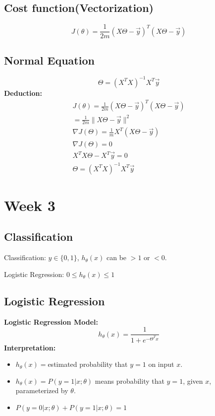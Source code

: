 \documentclass{article}
\begin{document}
\subsection{Cost function(Vectorization)}
$$J(\theta)=\frac{1}{2m}(X\Theta-\vec{y})^T(X\Theta-\vec{y})$$

\subsection{Normal Equation}
$$\Theta = (X^TX)^{-1}X^T\vec{y}$$
\textbf{Deduction:}
	\begin{eqnarray}
		J(\theta)=\frac{1}{2m}(X\Theta-\vec{y})^T(X\Theta-\vec{y})\nonumber\\
			=\frac{1}{2m}\lVert X\Theta - \vec{y}\rVert^2 \nonumber\\
		\nabla J(\Theta)=\frac{1}{m}X^T(X\Theta-\vec{y})\nonumber\\
		\nabla J(\Theta)=0 \nonumber \\
		X^TX\Theta-X^T\vec{y}=0 \nonumber \\
		\Theta = (X^TX)^{-1}X^T\vec{y} \nonumber
	\end{eqnarray}	
	
\section{Week 3}

\subsection{Classification}
\flushleft
Classification: $y\in \{0,1\}$, $h_\theta(x) $ can be $> 1$ or  $< 0$.

Logistic Regression: $0\leq h_\theta(x)\leq 1$

\subsection{Logistic Regression}
\textbf{Logistic Regression Model:}
	\begin{displaymath}
		h_\theta(x)=\frac{1}{1+e^{-\Theta^Tx}}
	\end{displaymath}
\textbf{Interpretation:}
	\begin{itemize}
		\item $h_\theta(x)=$estimated probability that $y=1$ on input $x$.
		\item $h_\theta(x)=P(y=1|x;\theta)$ means probability that $y=1$, given $x$, parameterized by $\theta$.
		\item $P(y=0|x;\theta)+P(y=1|x;\theta)=1$	
	\end{itemize}
\end{document}
